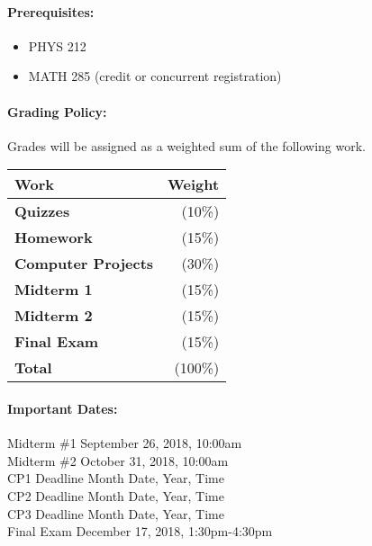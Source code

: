 \documentclass[11pt, a4paper]{article}
\begin{document}
\paragraph{Prerequisites:} 
\begin{itemize}
\item PHYS 212
\item MATH 285 (credit or concurrent registration)
\end{itemize}

\paragraph{Grading Policy:} Grades will be assigned as a weighted sum of the following work. 

\begin{table}[h]
\begin{tabularx}{\textwidth}{Xr}
\textbf{Work} & \textbf{Weight}\\
\hline
\textbf{Quizzes} & (10\%) \\
\textbf{Homework} & (15\%) \\
\textbf{Computer Projects} & (30\%) \\
\textbf{Midterm 1} & (15\%) \\
\textbf{Midterm 2} & (15\%) \\
\textbf{Final Exam} & (15\%) \\
\hline
\textbf{Total} & (100\%) \\
\end{tabularx}
\end{table}

\paragraph{Important Dates:}
\begin{center} \begin{minipage}{3.8in}
\begin{flushleft}
Midterm \#1       \dotfill September 26, 2018, 10:00am  \\
Midterm \#2       \dotfill October 31, 2018, 10:00am  \\
CP1 Deadline      \dotfill Month Date, Year, Time  \\
CP2 Deadline      \dotfill Month Date, Year, Time  \\
CP3 Deadline      \dotfill Month Date, Year, Time  \\
Final Exam        \dotfill December 17, 2018, 1:30pm-4:30pm  \\
\end{flushleft}
\end{minipage}
\end{center}
\end{document}
